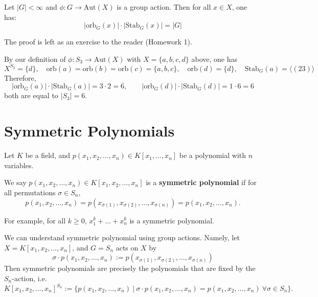 \begin{theorem}\label{thm-orbitStablizer}
Let $|G| < \infty$ and $\phi : G \to \mathrm{Aut}(X)$ is a group action. Then for all $x \in X$, one has:
\[
|\mathrm{orb}_G(x)| \cdot |\mathrm{Stab}_G(x)| = |G|
\]
\end{theorem}
The proof is left as an exercise to the reader (Homework 1).

\begin{example}
    By our definition of $\phi: S_3 \to \mathrm{Aut}(X)$ with $X = \{a,b,c,d\}$ above, one has
    $$X^{S_3} = \{d\}, \quad \mathrm{orb}(a) = \mathrm{orb}(b) = \mathrm{orb}(c) = \{a,b,c\},  \quad \mathrm{orb}(d) = \{d\},\quad \mathrm{Stab}_G(a) = \langle (23) \rangle$$
    Therefore,
    $$|\mathrm{orb}_G(a)| \cdot |\mathrm{Stab}_G(a)| = 3 \cdot 2 = 6, \quad \quad |\mathrm{orb}_G(d)| \cdot |\mathrm{Stab}_G(d)| = 1 \cdot 6 = 6$$
    both are equal to $|S_3| = 6$.
\end{example}


\section{Symmetric Polynomials} \label{sec-symm}
Let $K$ be a field, and $p(x_1, x_2, \dots, x_n) \in K[x_1, \dots, x_n]$ be a polynomial with $n$ variables.
\begin{definition}
    We say $p(x_1, x_2, \dots, x_n) \in K[x_1, x_2, \dots, x_n]$ is a {\bf symmetric polynomial} if for all permutations $\sigma \in S_n$, 
    $$p(x_1, x_2, \dots, x_n) = p(x_{\sigma(1)}, x_{\sigma(2)}, \dots, x_{\sigma(n)}) = p(x_1, x_2, \dots, x_n).$$
\end{definition}
For example, for all $k \geq 0$, $x_1^k + \dots 
+ x_n
^k$ is a symmetric polynomial.

We can understand symmetric polynomial using group actions. Namely, let $X = K[x_1, x_2, \dots, x_n]$, and $G = S_n$ acts on $X$ by
$$\sigma \cdot p(x_1, x_2, \dots, x_n) := p(x_{\sigma(1)}, x_{\sigma(2)}, \dots, x_{\sigma(n)})$$
Then symmetric polynomials are precisely the polynomials that are fixed by the $S_n$-action, i.e.
$$K[x_1, x_2, \dots, x_n]^{S_n} := \{ p(x_1, x_2, \dots, x_n)\ |\ \sigma \cdot p(x_1, x_2, \dots, x_n) = p(x_1, x_2, \dots, x_n)\ \forall \sigma \in S_n\} .$$


